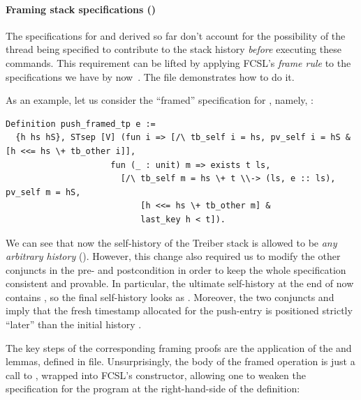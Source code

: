 \paragraph{Framing stack specifications ()}
\label{sec:fram-stack-spec}

The specifications for  and  derived so far don't
account for the possibility of the thread being specified to
contribute to the stack history \emph{before} executing these
commands. This requirement can be lifted by applying FCSL's
\emph{frame rule} to the specifications we have by
now~\cite{Sergey-al:ESOP15}. The file 
demonstrates how to do it.

As an example, let us consider the ``framed'' specification for
, namely, :

\begin{lstlisting}
Definition push_framed_tp e :=
  {h hs hS}, STsep [V] (fun i => [/\ tb_self i = hs, pv_self i = hS & [h <<= hs \+ tb_other i]],
                     fun (_ : unit) m => exists t ls, 
                       [/\ tb_self m = hs \+ t \\-> (ls, e :: ls), pv_self m = hS,
                           [h <<= hs \+ tb_other m] &
                           last_key h < t]).   
\end{lstlisting}

We can see that now the self-history of the Treiber stack is allowed
to be \emph{any arbitrary history} (). However,
this change also required us to modify the other conjuncts in the pre-
and postcondition in order to keep the whole specification consistent
and provable. In particular, the ultimate self-history at the end of
 now contains , so the final self-history looks as
. Moreover, the two
conjuncts \code{[h <<= hs \+ tb_other m]} and 
imply that the fresh timestamp  allocated for the push-entry
is positioned strictly ``later'' than the initial history .

The key steps of the corresponding framing proofs are the application
of the  and  lemmas, defined in
 file.
%
Unsurprisingly, the body of the framed operation  is
just a call to , wrapped into FCSL's  constructor,
allowing one to weaken the specification for the program at the
right-hand-side of the definition:

